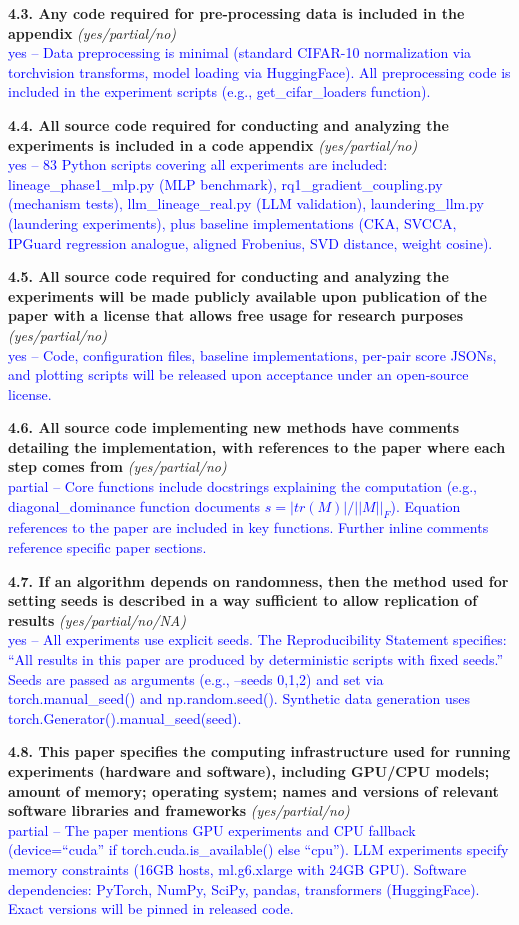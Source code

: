\documentclass[letterpaper]{article}
\newcommand{\question}[3]{%
    \textbf{#1} \textit{#2}\\
    \textcolor{blue}{#3}\par
}
\begin{document}
\question{4.3. Any code required for pre-processing data is included in the appendix}
{(yes/partial/no)}
{yes -- Data preprocessing is minimal (standard CIFAR-10 normalization via torchvision transforms, model loading via HuggingFace). All preprocessing code is included in the experiment scripts (e.g., get\_cifar\_loaders function).}

\question{4.4. All source code required for conducting and analyzing the experiments is included in a code appendix}
{(yes/partial/no)}
{yes -- 83 Python scripts covering all experiments are included: lineage\_phase1\_mlp.py (MLP benchmark), rq1\_gradient\_coupling.py (mechanism tests), llm\_lineage\_real.py (LLM validation), laundering\_llm.py (laundering experiments), plus baseline implementations (CKA, SVCCA, IPGuard regression analogue, aligned Frobenius, SVD distance, weight cosine).}

\question{4.5. All source code required for conducting and analyzing the experiments will be made publicly available upon publication of the paper with a license that allows free usage for research purposes}
{(yes/partial/no)}
{yes -- Code, configuration files, baseline implementations, per-pair score JSONs, and plotting scripts will be released upon acceptance under an open-source license.}

\question{4.6. All source code implementing new methods have comments detailing the implementation, with references to the paper where each step comes from}
{(yes/partial/no)}
{partial -- Core functions include docstrings explaining the computation (e.g., diagonal\_dominance function documents $s = |tr(M)| / ||M||_F$). Equation references to the paper are included in key functions. Further inline comments reference specific paper sections.}

\question{4.7. If an algorithm depends on randomness, then the method used for setting seeds is described in a way sufficient to allow replication of results}
{(yes/partial/no/NA)}
{yes -- All experiments use explicit seeds. The Reproducibility Statement specifies: ``All results in this paper are produced by deterministic scripts with fixed seeds.'' Seeds are passed as arguments (e.g., --seeds 0,1,2) and set via torch.manual\_seed() and np.random.seed(). Synthetic data generation uses torch.Generator().manual\_seed(seed).}

\question{4.8. This paper specifies the computing infrastructure used for running experiments (hardware and software), including GPU/CPU models; amount of memory; operating system; names and versions of relevant software libraries and frameworks}
{(yes/partial/no)}
{partial -- The paper mentions GPU experiments and CPU fallback (device=``cuda'' if torch.cuda.is\_available() else ``cpu''). LLM experiments specify memory constraints (16GB hosts, ml.g6.xlarge with 24GB GPU). Software dependencies: PyTorch, NumPy, SciPy, pandas, transformers (HuggingFace). Exact versions will be pinned in released code.}
\end{document}

